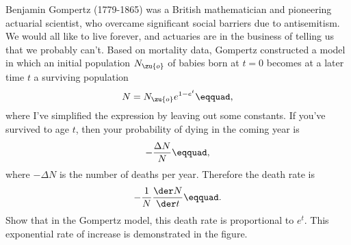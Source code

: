 Benjamin Gompertz (1779-1865) was a British mathematician and pioneering
actuarial scientist, who overcame significant social barriers due to
antisemitism. We would all like to live forever, and actuaries are in
the business of telling us that we probably can't. Based on mortality
data, Gompertz constructed a model in which an initial population $N_\zu{o}$
of babies born at $t=0$ becomes at a later time $t$ a surviving population
\begin{equation*}
  N = N_\zu{o} e^{1-e^t}\eqquad,
\end{equation*}
where I've simplified the expression by leaving out some constants.
If you've survived to age $t$, then your probability of dying in the coming
year is
\begin{equation*}
  -\frac{\Delta N}{N}\eqquad,
\end{equation*}
where $-\Delta N$ is the number of deaths per year. Therefore the death rate is
\begin{equation*}
  -\frac{1}{N}\frac{\der N}{\der t}\eqquad.
\end{equation*}
Show that in the Gompertz model, this death rate is proportional to
$e^t$. This exponential rate of increase is demonstrated in the figure.
